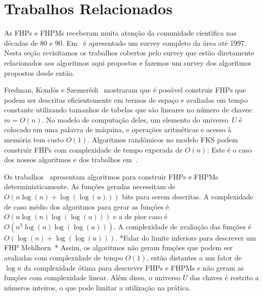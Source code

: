 \section{Trabalhos Relacionados}
As FHPs e FHPMs receberam muita aten\c{c}\~ao da comunidade 
cient\'{\i}fica nas d\'ecadas de 80 e 90. Em~\cite{chm97} \'e 
apresentado um survey completo da \'area at\'e 1997.
Nesta se\c{c}\~ao revisitamos os trabalhos cobertos pelo survey que
est\~ao diretamente relacionados aos algoritmos aqui propostos e
fazemos um survey dos algoritmos propostos desde ent\~ao.
 
Fredman, Koml\'os e Szemer\'edi~\cite{FKS84} mostraram que \'e poss\'{\i}vel construir
FHPs que podem ser descritas eficientemente em termos de espa\c{c}o e avaliadas em 
tempo constante utilizando tamanhos de tabelas que s\~ao lineares no n\'umero de chaves:
$m=O(n)$. 
No modelo de computa\c{c}\~ao deles, um elemento do universo~$U$ \'e colocado em uma 
palavra de m\'aquina, e opera\c{c}\~oes aritm\'eticas e acesso \`a mem\'oria tem custo 
$O(1)$.
Algoritmos rand\^omicos no modelo FKS podem construir FHPs com complexidade de tempo 
experada de $O(n)$: 
Este \'e o caso dos nossos algoritmos e dos trabalhos em~\cite{chm92,p99}.

Os trabalhos~\cite{asw00,swz00} apresentam algoritmos para construir
FHPs e FHPMs deterministicamente. 
As fun\c{c}\~oes geradas necessitam de $O(n \log(n) + \log(\log(u)))$ bits para serem descritas.
A complexidade de caso m\'edio dos algoritmos para gerar as fun\c{c}\~oes \'e 
$O(n\log(n) \log( \log (u)))$ e a de pior caso \'e $O(n^3\log(n) \log(\log(u)))$. 
A complexidade de avalia\c{c}\~ao das fun\c{c}\~oes \'e $O(\log(n) + \log(\log(u)))$.
*Falar do limite inferiors para descrever um FHP Mehlhorn~\cite{m84}*
Assim, os algoritmos n\~ao geram fun\c{c}\~oes que podem ser avaliadas com complexidade 
de tempo $O(1)$, est\~ao distantes a um fator de $\log n$ da complexidade \'otima para descrever 
FHPs e FHPMs e n\~ao geram as fun\c{c}\~oes com complexidade linear.
Al\'em disso, o universo $U$ das chaves \'e restrito a n\'umeros inteiros, o que pode 
limitar a utiliza\c{c}\~ao na pr\'atica. 

\cite{bkz05}